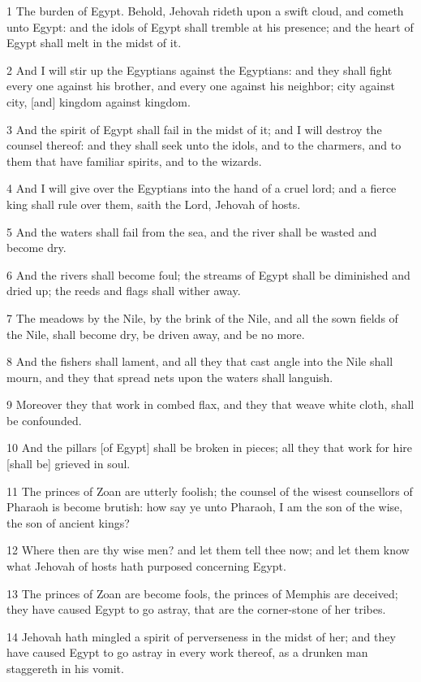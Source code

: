 \par 1 The burden of Egypt. Behold, Jehovah rideth upon a swift cloud, and cometh unto Egypt: and the idols of Egypt shall tremble at his presence; and the heart of Egypt shall melt in the midst of it.
\par 2 And I will stir up the Egyptians against the Egyptians: and they shall fight every one against his brother, and every one against his neighbor; city against city, [and] kingdom against kingdom.
\par 3 And the spirit of Egypt shall fail in the midst of it; and I will destroy the counsel thereof: and they shall seek unto the idols, and to the charmers, and to them that have familiar spirits, and to the wizards.
\par 4 And I will give over the Egyptians into the hand of a cruel lord; and a fierce king shall rule over them, saith the Lord, Jehovah of hosts.
\par 5 And the waters shall fail from the sea, and the river shall be wasted and become dry.
\par 6 And the rivers shall become foul; the streams of Egypt shall be diminished and dried up; the reeds and flags shall wither away.
\par 7 The meadows by the Nile, by the brink of the Nile, and all the sown fields of the Nile, shall become dry, be driven away, and be no more.
\par 8 And the fishers shall lament, and all they that cast angle into the Nile shall mourn, and they that spread nets upon the waters shall languish.
\par 9 Moreover they that work in combed flax, and they that weave white cloth, shall be confounded.
\par 10 And the pillars [of Egypt] shall be broken in pieces; all they that work for hire [shall be] grieved in soul.
\par 11 The princes of Zoan are utterly foolish; the counsel of the wisest counsellors of Pharaoh is become brutish: how say ye unto Pharaoh, I am the son of the wise, the son of ancient kings?
\par 12 Where then are thy wise men? and let them tell thee now; and let them know what Jehovah of hosts hath purposed concerning Egypt.
\par 13 The princes of Zoan are become fools, the princes of Memphis are deceived; they have caused Egypt to go astray, that are the corner-stone of her tribes.
\par 14 Jehovah hath mingled a spirit of perverseness in the midst of her; and they have caused Egypt to go astray in every work thereof, as a drunken man staggereth in his vomit.
